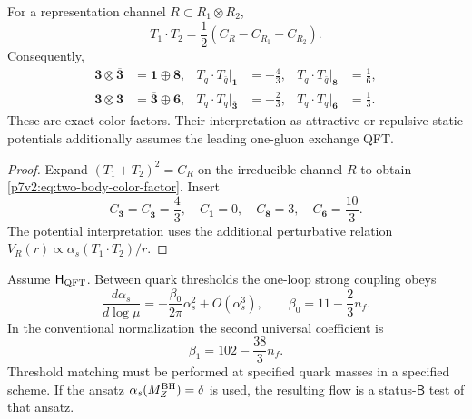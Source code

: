 \documentclass[12pt,a4paper]{article}
\newcommand{\Hqft}{\mathsf{H}_{\rm QFT}}
\begin{document}
\begin{proposition}
\label{p7v2:prop:color-channels}
For a representation channel
\(R\subset R_1\otimes R_2\),
\begin{equation}
\label{p7v2:eq:two-body-color-factor}
 T_1\!\cdot T_2
 =
 \frac12\left(C_R-C_{R_1}-C_{R_2}\right).
\end{equation}
Consequently,
\begin{align}
\label{p7v2:eq:meson-color-channels}
 \mathbf3\otimes\overline{\mathbf3}
 &=\mathbf1\oplus\mathbf8,
 &
 T_q\!\cdot T_{\bar q}\big|_{\mathbf1}
 &=-\frac43,
 &
 T_q\!\cdot T_{\bar q}\big|_{\mathbf8}
 &=\frac16,\\
\label{p7v2:eq:diquark-color-channels}
 \mathbf3\otimes\mathbf3
 &=\overline{\mathbf3}\oplus\mathbf6,
 &
 T_q\!\cdot T_q\big|_{\overline{\mathbf3}}
 &=-\frac23,
 &
 T_q\!\cdot T_q\big|_{\mathbf6}
 &=\frac13.
\end{align}
These are exact color factors.  Their interpretation as attractive or
repulsive static potentials additionally assumes the leading one-gluon
exchange QFT.
\end{proposition}

\begin{proof}
Expand
\((T_1+T_2)^2=C_R\) on the irreducible channel \(R\) to obtain
\eqref{p7v2:eq:two-body-color-factor}.  Insert
\[
 C_{\mathbf3}=C_{\overline{\mathbf3}}=\frac43,\quad
 C_{\mathbf1}=0,\quad C_{\mathbf8}=3,\quad C_{\mathbf6}=\frac{10}{3}.
\]
The potential interpretation uses the additional perturbative relation
\(V_R(r)\propto\alpha_s(T_1\!\cdot T_2)/r\).
\end{proof}

\begin{proposition}
\label{p7v2:prop:qcd-running}
Assume \(\Hqft\).  Between quark thresholds the one-loop strong coupling obeys
\begin{equation}
\label{p7v2:eq:qcd-one-loop}
 \frac{d\alpha_s}{d\log\mu}
 =
 -\frac{\beta_0}{2\pi}\alpha_s^2+O(\alpha_s^3),
 \qquad
 \beta_0=11-\frac23n_f.
\end{equation}
In the conventional normalization the second universal coefficient is
\begin{equation}
\label{p7v2:eq:qcd-two-loop-coefficient}
 \beta_1=102-\frac{38}{3}n_f.
\end{equation}
Threshold matching must be performed at specified quark masses in a specified
scheme.  If the ansatz
\(\alpha_s(M_Z^{\rm BH})=\delta\) is used, the resulting flow is a
status-\(\mathsf B\) test of that ansatz.
\end{proposition}
\end{document}
